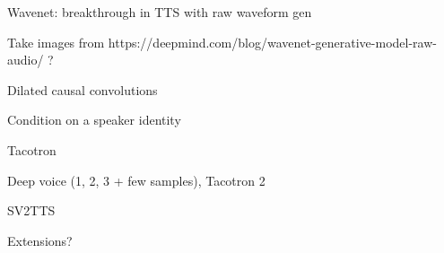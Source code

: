 \documentclass[a4paper, oneside]{article}
\begin{document}
\color{red}


Wavenet: breakthrough in TTS with raw waveform gen

Take images from https://deepmind.com/blog/wavenet-generative-model-raw-audio/ ?

Dilated causal convolutions

Condition on a speaker identity

Tacotron

Deep voice (1, 2, 3 + few samples), Tacotron 2

SV2TTS

Extensions?
\color{black}



\color{red}
\color{black}

\clearpage

 


























\end{document}
